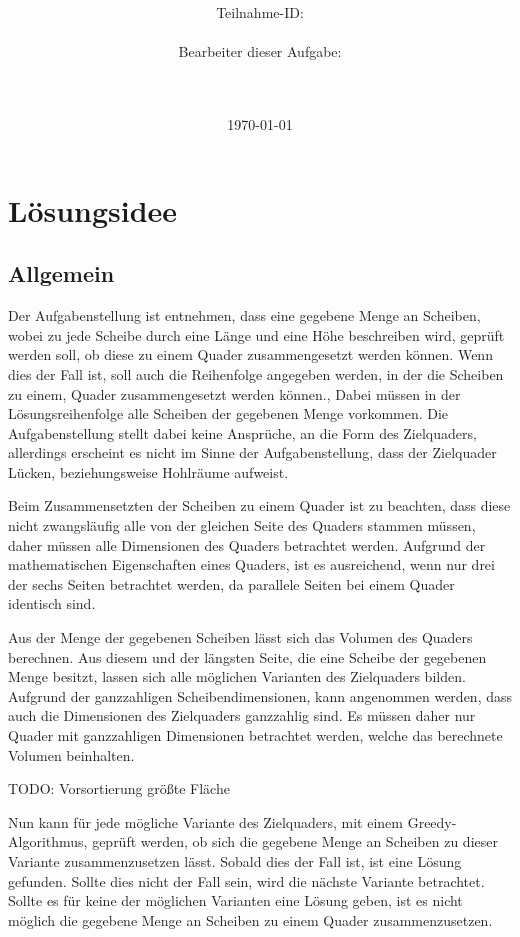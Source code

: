 \documentclass[a4paper,10pt,ngerman]{scrartcl}
\title{\textbf{\Huge\Aufgabe}}
\author{\LARGE Teilnahme-ID: \LARGE \TeilnahmeId \\\\
\LARGE Bearbeiter dieser Aufgabe: \\
\LARGE \Name\\\\}
\date{\LARGE\today}
\begin{document}
    \maketitle
    \tableofcontents
    \vspace{0.5cm}
    \newpage


    \section{Lösungsidee}\label{sec:losungsidee}

    \subsection{Allgemein}\label{subsec:allgemein}

    Der Aufgabenstellung ist entnehmen, dass eine gegebene Menge an Scheiben, wobei zu jede Scheibe durch
    eine Länge und eine Höhe beschreiben wird, geprüft werden soll, ob diese zu einem Quader zusammengesetzt werden können.
    Wenn dies der Fall ist, soll auch die Reihenfolge angegeben werden, in der die Scheiben zu einem, Quader zusammengesetzt werden können.,
    Dabei müssen in der Lösungsreihenfolge alle Scheiben der gegebenen Menge vorkommen.
    Die Aufgabenstellung stellt dabei keine Ansprüche, an die Form des Zielquaders, allerdings erscheint es nicht im Sinne der Aufgabenstellung,
    dass der Zielquader Lücken, beziehungsweise Hohlräume aufweist.

    Beim Zusammensetzten der Scheiben zu einem Quader ist zu beachten, dass diese nicht zwangsläufig alle von der gleichen Seite des Quaders stammen müssen,
    daher müssen alle Dimensionen des Quaders betrachtet werden.
    Aufgrund der mathematischen Eigenschaften eines Quaders, ist es ausreichend, wenn nur drei der sechs Seiten betrachtet werden,
    da parallele Seiten bei einem Quader identisch sind.

    Aus der Menge der gegebenen Scheiben lässt sich das Volumen des Quaders berechnen.
    Aus diesem und der längsten Seite, die eine Scheibe der gegebenen Menge besitzt, lassen sich alle möglichen Varianten des Zielquaders bilden.
    Aufgrund der ganzzahligen Scheibendimensionen, kann angenommen werden, dass auch die Dimensionen des Zielquaders ganzzahlig sind.
    Es müssen daher nur Quader mit ganzzahligen Dimensionen betrachtet werden, welche das berechnete Volumen beinhalten.

    TODO: Vorsortierung größte Fläche

    Nun kann für jede mögliche Variante des Zielquaders, mit einem Greedy-Algorithmus, geprüft werden,
    ob sich die gegebene Menge an Scheiben zu dieser Variante zusammenzusetzen lässt.
    Sobald dies der Fall ist, ist eine Lösung gefunden.
    Sollte dies nicht der Fall sein, wird die nächste Variante betrachtet.
    Sollte es für keine der möglichen Varianten eine Lösung geben, ist es nicht möglich die gegebene Menge an Scheiben
    zu einem Quader zusammenzusetzen.
\end{document}
